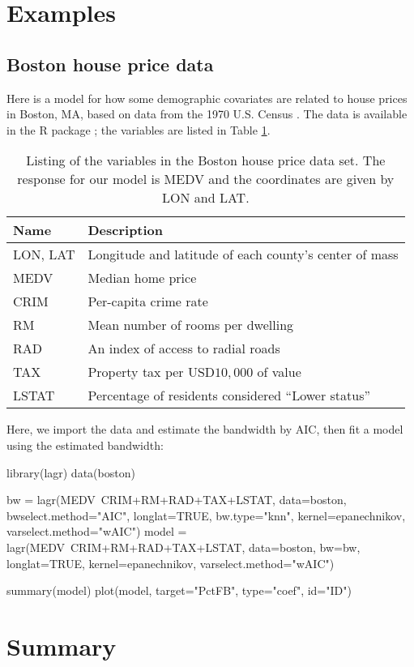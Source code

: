 \section{Examples}
\subsection{Boston house price data}
Here is a model for how some demographic covariates are related to house prices in Boston, MA, based on data from the 1970 U.S. Census \citep{Pace-Gilley-1997}. The data is available in the R package ; the variables are listed in Table \ref{table:boston-data}.

\begin{table}[h]
	\centering
	\begin{adjustbox}{max width=\textwidth}
	\begin{tabular}{ll}
	Name & Description \\
	\hline
	LON, LAT & Longitude and latitude of each county's center of mass \\
	MEDV & Median home price\\
	CRIM & Per-capita crime rate \\
	RM & Mean number of rooms per dwelling \\
	RAD & An index of access to radial roads \\
	TAX & Property tax per USD$10,000$ of value\\
	LSTAT & Percentage of residents considered ``Lower status''
	\end{tabular}
	\end{adjustbox}
	\caption{Listing of the variables in the Boston house price data set. The response for our model is MEDV and the coordinates are given by LON and LAT.
	\label{table:boston-data}}
\end{table}

Here, we import the data and estimate the bandwidth by AIC, then fit a model using the estimated bandwidth:


\begin{example}
library(lagr)
data(boston)

bw = lagr(MEDV~CRIM+RM+RAD+TAX+LSTAT, data=boston, bwselect.method="AIC",
  longlat=TRUE, bw.type="knn", kernel=epanechnikov,
  varselect.method="wAIC")
model = lagr(MEDV~CRIM+RM+RAD+TAX+LSTAT, data=boston, bw=bw,
  longlat=TRUE, kernel=epanechnikov, varselect.method="wAIC")

summary(model)
plot(model, target="PctFB", type="coef", id="ID")

\end{example}


\section{Summary}



\address{Wesley Brooks\\
  Department of Statistics, University of Wisconsin-Madison\\
  1300 University Ave. Madison, WI 53706\\
  USA}

